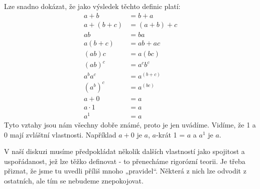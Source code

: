     Lze snadno dokázat, že jako výsledek těchto definic platí:
    \begin{subequations}\label{fyz:eq647}
      \begin{align}
        a+b       &=   b+a          \label{fyz:eq647a}\\
        a+(b + c) &=  (a+b)+c       \label{fyz:eq647b}\\
        ab        &=    ba          \label{fyz:eq647c}\\
        a(b + c)  &=  ab + ac       \label{fyz:eq647d}\\
        (ab)c     &=  a(bc)         \label{fyz:eq647e}\\
        (ab)^c    &= a^cb^c         \label{fyz:eq647f}\\
        a^ba^c    &= a^{(b+c)}      \label{fyz:eq647g}\\
        {(a^b)}^c &= a^{(bc)}       \label{fyz:eq647h}\\
        a + 0     &=    a           \label{fyz:eq647i}\\
        a\cdot1   &=    a           \label{fyz:eq647j}\\
        a^1       &=    a           \label{fyz:eq647k}
      \end{align}
    \end{subequations}
    Tyto vztahy jsou nám všechny dobře známé, proto je jen uvádíme. Vidíme, že \num{1} a \num{0}
    mají zvláštní vlastnosti. Například \(a + 0\) je \(a\), \(a\)-krát \num{1} = \(a\) a \(a^1\) je
    \(a\).
    
    V naší diskuzi musíme předpokládat několik dalších vlastností jako spojitost a uspořádanost, jež
    lze těžko deﬁnovat - to přenecháme rigorózní teorii. Je třeba přiznat, že jsme tu uvedli příliš
    mnoho „pravidel“. Některá z nich lze odvodit z ostatních, ale tím se nebudeme znepokojovat.
  
